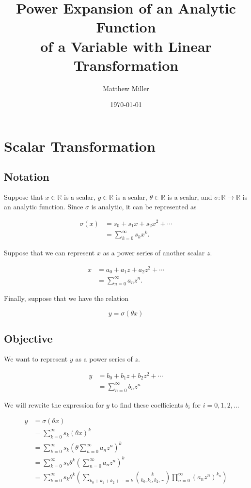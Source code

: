 \documentclass{article}
\title{Power Expansion of an Analytic Function \\ of a Variable with Linear Transformation}
\author{Matthew Miller}
\date{\today}
\begin{document}
\maketitle

\section{Scalar Transformation}

\subsection{Notation}
\noindent
Suppose that $x \in \mathbb{R}$ is a scalar, $y \in \mathbb{R}$ is a scalar, $\theta \in \mathbb{R}$ is a scalar, and $\sigma: \mathbb{R} \to \mathbb{R}$ is an analytic function. Since $\sigma$ is analytic, it can be represented as

\begin{align*}
    \sigma(x)
    &= s_0 + s_1 x + s_2 x^2 + \cdots \\
    &= \sum_{k=0}^{\infty} s_{k} x^{k}.
\end{align*}

\noindent
Suppose that we can represent $x$ as a power series of another scalar $z$.

\begin{align*}
    x
    &= a_0 + a_1 z + a_2 z^2 + \cdots \\
    &= \sum_{n=0}^{\infty} a_{n} z^{n}.
\end{align*}

\noindent
Finally, suppose that we have the relation

\begin{equation*}
    y = \sigma(\theta x)
\end{equation*}

\subsection{Objective}
\noindent
We want to represent $y$ as a power series of $z$.

\begin{align*}
    y
    &= b_0 + b_1 z + b_2 z^2 + \cdots \\
    &= \sum_{n=0}^{\infty} b_{n} z^{n}
\end{align*}

\noindent
We will rewrite the expression for $y$ to find these coefficients $b_i$ for $i = 0, 1, 2, \ldots$

\begin{align*}
    y
    &= \sigma(\theta x) \\
    &= \sum_{k=0}^{\infty} s_k (\theta x)^k \\
    &= \sum_{k=0}^{\infty} s_k \left(\theta \sum_{n=0}^{\infty} a_{n} z^{n}\right)^{k} \\
    &= \sum_{k=0}^{\infty} s_k \theta^k \left(\sum_{n=0}^{\infty} a_{n} z^{n}\right)^{k} \\
    &= \sum_{k=0}^{\infty} s_k \theta^k \left(\sum_{k_0 + k_1 + k_2 + \cdots = k} \binom{k}{k_0, k_1, k_2, \cdots} \prod_{n=0}^{\infty} (a_n z^{n})^{k_n} \right)
\end{align*}
\end{document}
